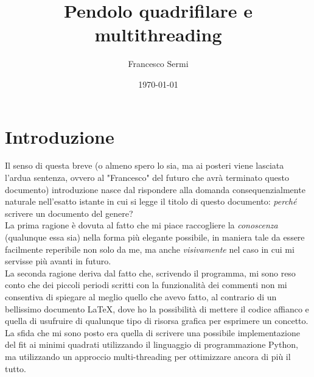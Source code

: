 \documentclass{report}
\title{Pendolo quadrifilare e multithreading}
\author{Francesco Sermi}
\date{\today}
\begin{document}
	\maketitle
	\tableofcontents
	\chapter{Introduzione}
	Il senso di questa breve (o almeno spero lo sia, ma ai posteri viene lasciata l'ardua sentenza, ovvero al "Francesco" del futuro che avrà terminato questo documento) introduzione nasce dal rispondere alla domanda consequenzialmente naturale nell'esatto istante in cui si legge il titolo di questo documento: \emph{perché} scrivere un documento del genere? \\
	La prima ragione è dovuta al fatto che mi piace raccogliere la \emph{conoscenza} (qualunque essa sia) nella forma più elegante possibile, in maniera tale da essere facilmente reperibile non solo da me, ma anche \emph{visivamente} nel caso in cui mi servisse più avanti in futuro. \\
	La seconda ragione deriva dal fatto che, scrivendo il programma, mi sono reso conto che dei piccoli periodi scritti con la funzionalità dei commenti non mi consentiva di spiegare al meglio quello che avevo fatto, al contrario di un bellissimo documento \LaTeX , dove ho la possibilità di mettere il codice affianco e quella di usufruire di qualunque tipo di risorsa grafica per esprimere un concetto. \\
	La sfida che mi sono posto era quella di scrivere una possibile implementazione del fit ai minimi quadrati utilizzando il linguaggio di programmazione Python, ma utilizzando un approccio multi-threading per ottimizzare ancora di più il tutto. \\
\end{document}
